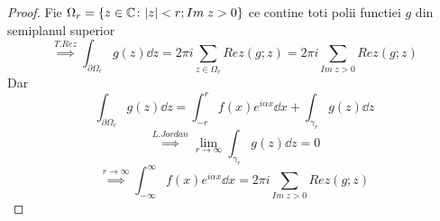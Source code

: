 \begin{tip}
\begin{proof}
        Fie $\Omega_r = \{z \in \mathbb{C} \colon |z|<r ; Im\; z>0\}$ ce contine toti polii functiei
        $g$ din semiplanul superior
        \[
            \overset{T.Rez}{\implies} \int_{\partial \Omega_r} g(z) \dd z
                = 2 \pi i \sum_{z \in \Omega_r} Rez(g;z)
                = 2 \pi i \sum_{Im\; z > 0} Rez(g;z)
        \]
        Dar
        \[
            \int_{\partial \Omega_r} g(z) \dd z
                = \int_{-r}^{r} f(x)e^{i \alpha x} \dd x
                + \int_{\gamma_r} g(z) \dd z
        \]
        \[
            \overset{L.Jordan}{\implies} \lim_{r \to \infty} \int_{\gamma_r} g(z) \dd z = 0
        \]
        \[
            \overset{r\to\infty}{\implies} \int_{-\infty}^{\infty} f(x)e^{i \alpha x} \dd x
                = 2 \pi i \sum_{Im\; z > 0} Rez(g;z)
        \]
    \end{proof}

\end{tip}